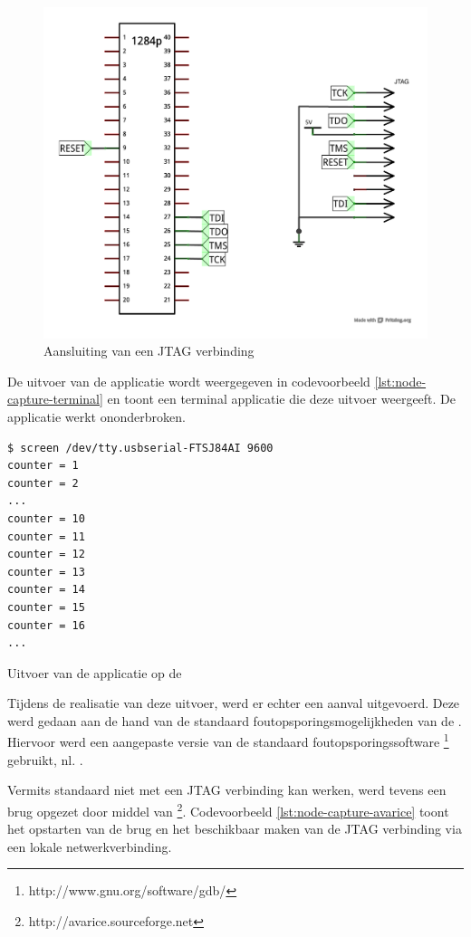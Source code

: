 \begin{figure}[ht]
  \centering
  \includegraphics[width=0.7\linewidth]{resources/node-capture-jtag.pdf}
  \caption{Aansluiting van een JTAG verbinding}
  \label{fig:node-capture-jtag}
\end{figure}

De uitvoer van de applicatie wordt weergegeven in codevoorbeeld
\ref{lst:node-capture-terminal} en toont een terminal applicatie die deze
uitvoer weergeeft. De applicatie werkt ononderbroken.

\begin{listing}[ht]
  \begin{verbatim}
$ screen /dev/tty.usbserial-FTSJ84AI 9600
counter = 1
counter = 2
...
counter = 10
counter = 11
counter = 12
counter = 13
counter = 14
counter = 15
counter = 16
...
\end{verbatim}
  \caption{Uitvoer van de applicatie op de \mcu}
  \label{lst:node-capture-terminal}
\end{listing}

Tijdens de realisatie van deze uitvoer, werd er echter een aanval uitgevoerd.
Deze werd gedaan aan de hand van de standaard foutopsporingsmogelijkheden van
de \mcu. Hiervoor werd een aangepaste versie van de standaard
foutopsporingssoftware \footnote{http://www.gnu.org/software/gdb/}
gebruikt, nl. .

Vermits  standaard niet met een JTAG verbinding kan werken, werd
tevens een brug opgezet door middel van
\footnote{http://avarice.sourceforge.net}. Codevoorbeeld
\ref{lst:node-capture-avarice} toont het opstarten van de brug en het
beschikbaar maken van de JTAG verbinding via een lokale netwerkverbinding.

